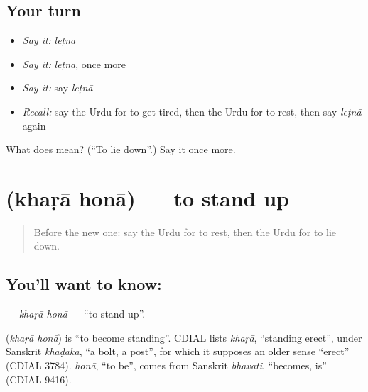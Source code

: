 \subsection*{Your turn}
\begin{itemize}
\raggedright
  \item \emph{Say it:} \emph{leṭnā}
  \item \emph{Say it:} \emph{leṭnā}, once more
  \item \emph{Say it:} say \emph{leṭnā}
  \item \emph{Recall:} say the Urdu for to get tired, then the Urdu for to rest, then say \emph{leṭnā} again
\end{itemize}

\begin{tcolorbox}[breakable,colback=teal!4,colframe=teal!35!black,title={Before you move on}]
What does  mean? (\textquotedblleft{}To lie down\textquotedblright{}.) Say it once more.
\end{tcolorbox}
\section[\texorpdfstring{\ur{کھڑا} \ur{ہونا} (khaṛā honā)}{کھڑا ہونا (khaṛā honā)}]{  (khaṛā honā) — to stand up}

\label{lesson:UR-C182-khara-hona}



\begin{quote}
Before the new one: say the Urdu for to rest, then the Urdu for to lie down.
\end{quote}

\subsection*{You'll want to know:  }
\textbf{ } — \emph{khaṛā honā} — \textquotedblleft{}to stand up\textquotedblright{}.

\begin{cousinweb}
\textbf{ } (\emph{khaṛā honā}) is \textquotedblleft{}to become standing\textquotedblright{}. CDIAL lists \emph{khaṛā}, \textquotedblleft{}standing erect\textquotedblright{}, under Sanskrit \emph{khaḍaka}, \textquotedblleft{}a bolt, a post\textquotedblright{}, for which it supposes an older sense \textquotedblleft{}erect\textquotedblright{} (CDIAL 3784). \emph{honā}, \textquotedblleft{}to be\textquotedblright{}, comes from Sanskrit \emph{bhavati}, \textquotedblleft{}becomes, is\textquotedblright{} (CDIAL 9416).
\end{cousinweb}

